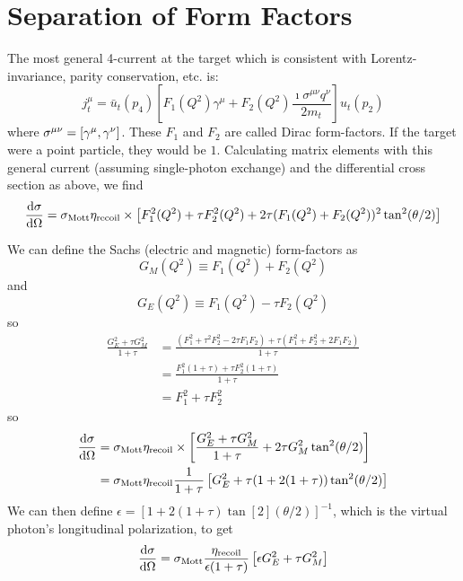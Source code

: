 \documentclass[a4paper,twoside,master.tex]{subfiles}
\begin{document}
\section{Separation of Form Factors}\label{sec:separation_of_form_factors}

The most general 4-current at the target which is consistent with Lorentz-invariance, parity conservation, etc. is:
\begin{equation}
    j_t^{\mu} = \bar{u}_t(p_4) \left[ F_1(Q^2) \gamma^{\mu} + F_2(Q^2) \frac{\imath \sigma^{\mu \nu} q^{\nu}}{2 m_t} \right]u_t(p_2)
\end{equation}
where $ \sigma^{\mu \nu} = \comm{\gamma^{\mu}}{\gamma^{\nu}} $. These $ F_1 $ and $ F_2 $ are called Dirac form-factors. If the target were a point particle, they would be $ 1 $. Calculating matrix elements with this general current (assuming single-photon exchange) and the differential cross section as above, we find
\begin{equation}
    \dv{\sigma}{\Omega} = \sigma_{\text{Mott}} \eta_{\text{recoil}} \times \left[ F_1^2(Q^2) + \tau F_2^2(Q^2) + 2 \tau(F_1(Q^2) + F_2(Q^2))^2 \tan[2](\theta / 2) \right]
\end{equation}

We can define the Sachs (electric and magnetic) form-factors as
\begin{equation}
    G_M(Q^2) \equiv F_1(Q^2) + F_2(Q^2)
\end{equation}
and
\begin{equation}
    G_E(Q^2) \equiv F_1(Q^2) - \tau F_2(Q^2)
\end{equation}
so
\begin{align}
    \frac{G_E^2 + \tau G_M^2}{1 + \tau} &= \frac{(F_1^2 + \tau^2 F_2^2 - 2 \tau F_1 F_2) + \tau (F_1^2 + F_2^2 + 2 F_1 F_2)}{1 + \tau} \\
                                        &= \frac{F_1^2 (1 + \tau) + \tau F_2^2 (1 + \tau)}{1 + \tau} \\
                                        &= F_1^2 + \tau F_2^2
\end{align}
so
\begin{align}
    \dv{\sigma}{\Omega} &= \sigma_{\text{Mott}} \eta_{\text{recoil}} \times \left[ \frac{G_E^2 + \tau G_M^2}{1 + \tau} + 2 \tau G_M^2 \tan[2](\theta / 2) \right] \\
                        &= \sigma_{\text{Mott}} \eta_{\text{recoil}} \frac{1}{1 + \tau} \left[ G_E^2 + \tau (1 + 2(1 + \tau)) \tan[2]( \theta / 2) \right]
\end{align}
We can then define $ \epsilon = \left[ 1 + 2 (1 + \tau) \tan[2](\theta / 2) \right]^{-1} $, which is the virtual photon's longitudinal polarization, to get
\begin{equation}
    \dv{\sigma}{\Omega} = \sigma_{\text{Mott}} \frac{\eta_{\text{recoil}}}{\epsilon (1 + \tau)} \left[ \epsilon G_E^2 + \tau G_M^2 \right]
\end{equation}
\end{document}
